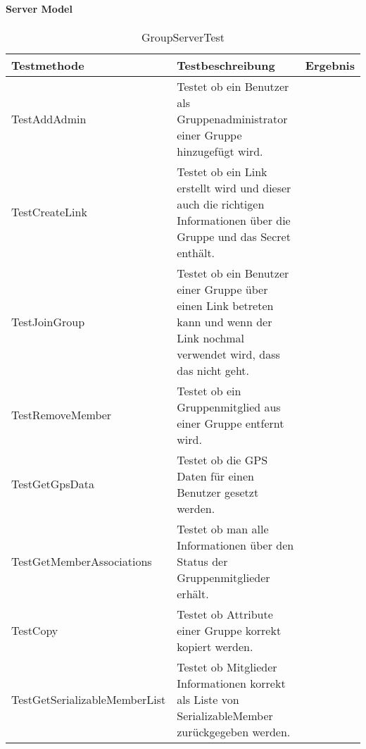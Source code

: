 		\paragraph{Server Model}
		\begin{table}[H]
			{
				\begin{tabular}{|p{}|p{}|>{\centering}p{}|}
					\hline
					Testmethode & Testbeschreibung & Ergebnis\tabularnewline
					\hline
					\hspace{0pt}TestAddAdmin & Testet ob ein Benutzer als Gruppenadministrator einer Gruppe hinzugefügt wird. &	\checkmark\tabularnewline
					\hspace{0pt}TestCreateLink & Testet ob ein Link erstellt wird und dieser auch die richtigen Informationen über die Gruppe und das Secret enthält. &	\checkmark\tabularnewline
					\hspace{0pt}TestJoinGroup & Testet ob ein Benutzer einer Gruppe über einen Link betreten kann und wenn der Link nochmal verwendet wird, dass das nicht geht. &	\checkmark\tabularnewline
					\hspace{0pt}TestRemoveMember & Testet ob ein Gruppenmitglied aus einer Gruppe entfernt wird. &	\checkmark\tabularnewline
					\hspace{0pt}TestGetGpsData & Testet ob die GPS Daten für einen Benutzer gesetzt werden. &	\checkmark\tabularnewline
					\hspace{0pt}TestGetMemberAssociations & Testet ob man alle Informationen über den Status der Gruppenmitglieder erhält. &	\checkmark\tabularnewline
                         \hspace{0pt}TestCopy & Testet ob Attribute einer Gruppe korrekt kopiert werden. &	\checkmark\tabularnewline
                         \hspace{0pt}TestGetSerializableMemberList & Testet ob Mitglieder Informationen korrekt als Liste von SerializableMember zurückgegeben werden. &	\checkmark\tabularnewline
					\hline
				\end{tabular}}
				\caption{GroupServerTest}
			\end{table}

